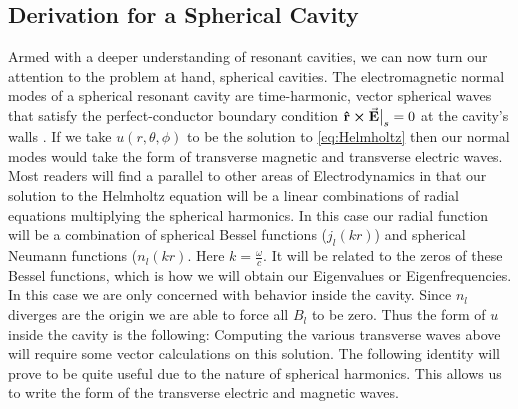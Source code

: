 \subsection{Derivation for a Spherical Cavity}
Armed with a deeper understanding of resonant cavities, we can now turn our attention to the problem at hand, spherical cavities. The electromagnetic normal modes of a spherical resonant cavity are time-harmonic, vector spherical waves that satisfy the perfect-conductor boundary condition $\vu{r}\cross \va{E}\big{|}_s=0$ at the cavity’s walls \cite{Zangwill}. If we take $u(r,\theta,\phi)$ to be the solution to \eqref{eq:Helmholtz} then our normal modes would take the form of transverse magnetic and transverse electric waves.
Most readers will find a parallel to other areas of Electrodynamics in that our solution to the Helmholtz equation will be a linear combinations of radial equations multiplying the spherical harmonics. In this case our radial function will be a combination of spherical Bessel functions ($j_l(kr)$) and spherical Neumann functions ($n_l(kr)$.
Here $k=\frac{\omega}{c}$. It will be related to the zeros of these Bessel functions, which is how we will obtain our Eigenvalues or Eigenfrequencies. In this case we are only concerned with behavior inside the cavity. Since $n_l$ diverges are the origin we are able to force all $B_l$ to be zero\cite{Jackson}. Thus the form of $u$ inside the cavity is the following:
Computing the various transverse waves above will require some vector calculations on this solution. The following identity will prove to be quite useful due to the nature of spherical harmonics.
This allows us to write the form of the transverse electric and magnetic waves\cite{Zangwill}.

